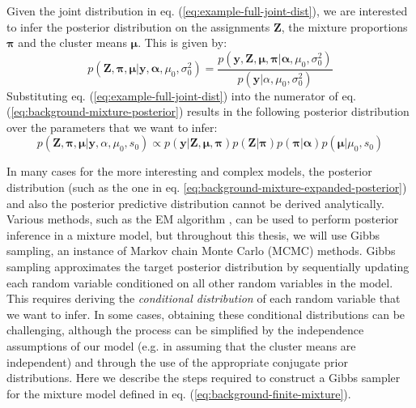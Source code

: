 Given the joint distribution in eq. (\ref{eq:example-full-joint-dist}), we are interested to infer the posterior distribution on the assignments $\boldsymbol{Z}$, the mixture proportions $\boldsymbol{\pi}$ and the cluster means $\boldsymbol{\mu}$. This is given by:
\begin{equation}
p(\boldsymbol{Z},\boldsymbol{\pi},\boldsymbol{\mu} \vert \boldsymbol{y}, \boldsymbol{\alpha},\mu_0,\sigma_0^2) = \frac{p(\boldsymbol{y}, \boldsymbol{Z}, \boldsymbol{\mu},\boldsymbol{\pi} \vert \boldsymbol{\alpha},\mu_0,\sigma_0^2)}{p(\boldsymbol{y} \vert \alpha,\mu_0,\sigma_0^2)}
\label{eq:background-mixture-posterior}
\end{equation}
Substituting eq. (\ref{eq:example-full-joint-dist}) into the numerator of eq. (\ref{eq:background-mixture-posterior}) results in the following posterior distribution over the parameters that we want to infer:
\begin{equation}
p(\boldsymbol{Z},\boldsymbol{\pi},\boldsymbol{\mu} \vert \boldsymbol{y},\alpha,\mu_0,s_0) \propto p(\boldsymbol{y} \vert \boldsymbol{Z}, \boldsymbol{\mu},\boldsymbol{\pi}) p(\boldsymbol{Z} \vert \boldsymbol{\pi}) p(\boldsymbol{\pi} \vert \boldsymbol{\alpha}) p(\boldsymbol{\mu} \vert \mu_0, s_0)
\label{eq:background-mixture-expanded-posterior}
\end{equation}

In many cases for the more interesting and complex models, the posterior distribution (such as the one in eq. \ref{eq:background-mixture-expanded-posterior}) and also the posterior predictive distribution cannot be derived analytically. Various methods, such as the EM algorithm \cite{gelman2014bayesian}, can be used to perform posterior inference in a mixture model, but throughout this thesis, we will use Gibbs sampling, an instance of Markov chain Monte Carlo (MCMC) methods. Gibbs sampling approximates the target posterior distribution by sequentially updating each random variable conditioned on all other random variables in the model. This requires deriving the \emph{conditional distribution} of each random variable that we want to infer. In some cases, obtaining these conditional distributions can be challenging, although the process can be simplified by the independence assumptions of our model (e.g. in assuming that the cluster means are independent) and through the use of the appropriate conjugate prior distributions.  Here we describe the steps required to construct a Gibbs sampler for the mixture model defined in eq. (\ref{eq:background-finite-mixture}).

